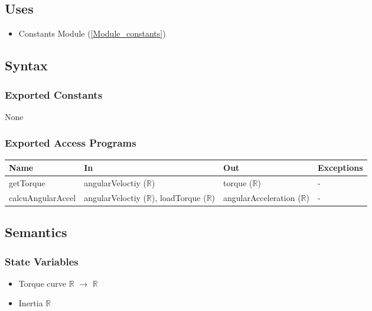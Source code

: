 \documentclass[12pt, titlepage]{article}
\begin{document}
\subsection{Uses}

\begin{itemize}
  \item Constants Module (\ref{Module_constants})
\end{itemize}

\subsection{Syntax}

\subsubsection{Exported Constants}
None

\subsubsection{Exported Access Programs}

\begin{center}
\begin{tabular}{p{4cm} p{4cm} p{4cm} p{2cm}}
\hline
\textbf{Name} & \textbf{In} & \textbf{Out} & \textbf{Exceptions} \\
\hline
getTorque & angularVeloctiy ($\mathbb{R}$) & torque ($\mathbb{R}$) & - \\
calcuAngularAccel & angularVeloctiy ($\mathbb{R}$), loadTorque ($\mathbb{R}$)  & angularAcceleration ($\mathbb{R}$) & - \\
\hline
\end{tabular}
\end{center}

\subsection{Semantics}

\subsubsection{State Variables}

\begin{itemize}
  \item Torque curve $\mathbb{R}$ $\rightarrow$ $\mathbb{R}$
  \item Inertia $\mathbb{R}$
\end{itemize}
\end{document}
